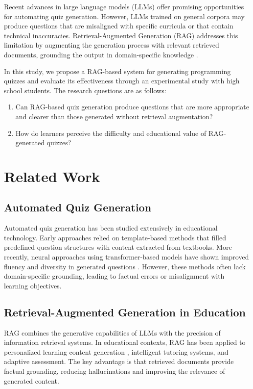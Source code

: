 \documentclass[11pt,a4paper]{article}
\begin{document}
Recent advances in large language models (LLMs) offer promising opportunities for automating quiz generation. However, LLMs trained on general corpora may produce questions that are misaligned with specific curricula or that contain technical inaccuracies. Retrieval-Augmented Generation (RAG) addresses this limitation by augmenting the generation process with relevant retrieved documents, grounding the output in domain-specific knowledge \parencite{wang2024}.

In this study, we propose a RAG-based system for generating programming quizzes and evaluate its effectiveness through an experimental study with high school students. The research questions are as follows:

\begin{enumerate}
  \item Can RAG-based quiz generation produce questions that are more appropriate and clearer than those generated without retrieval augmentation?
  \item How do learners perceive the difficulty and educational value of RAG-generated quizzes?
\end{enumerate}

\section{Related Work}

\subsection{Automated Quiz Generation}

Automated quiz generation has been studied extensively in educational technology. Early approaches relied on template-based methods that filled predefined question structures with content extracted from textbooks. More recently, neural approaches using transformer-based models have shown improved fluency and diversity in generated questions \parencite{chen2023}. However, these methods often lack domain-specific grounding, leading to factual errors or misalignment with learning objectives.

\subsection{Retrieval-Augmented Generation in Education}

RAG combines the generative capabilities of LLMs with the precision of information retrieval systems. In educational contexts, RAG has been applied to personalized learning content generation \parencite{wang2024}, intelligent tutoring systems, and adaptive assessment. The key advantage is that retrieved documents provide factual grounding, reducing hallucinations and improving the relevance of generated content.
\end{document}
